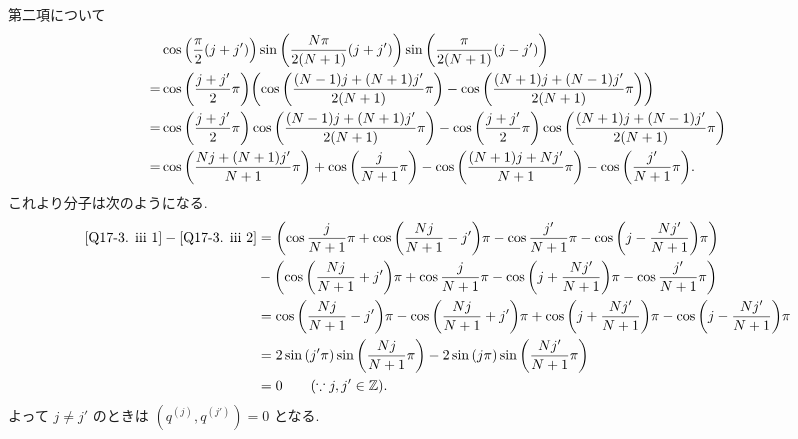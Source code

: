 \documentclass[uplatex,dvipdfmx,a4paper,11pt]{jlreq}
\newcommand{\ZZ}{\mathbb{Z}}
\theoremstyle{definition}
\begin{document}
第二項について
\begin{align}
    & \cos\qty(\frac{\pi}{2}(j + j'))\sin\qty(\frac{N\pi}{2(N+1)}(j + j'))\sin\qty(\frac{\pi}{2(N+1)}(j - j'))                                                       \\
  = & \cos\qty(\frac{j + j'}{2}\pi)\qty(\cos\qty(\frac{(N-1)j + (N+1)j'}{2(N+1)}\pi) - \cos\qty(\frac{(N+1)j + (N-1)j'}{2(N+1)}\pi))                                 \\
  = & \cos\qty(\frac{j + j'}{2}\pi)\cos\qty(\frac{(N-1)j + (N+1)j'}{2(N+1)}\pi) - \cos\qty(\frac{j + j'}{2}\pi)\cos\qty(\frac{(N+1)j + (N-1)j'}{2(N+1)}\pi)          \\
  = & \cos\qty(\frac{Nj + (N+1)j'}{N+1}\pi) + \cos\qty(\frac{j}{N+1}\pi) - \cos\qty(\frac{(N+1)j + Nj'}{N+1}\pi) - \cos\qty(\frac{j'}{N+1}\pi). \label{Q17-3. iii 2}
\end{align}
これより分子は次のようになる.
\begin{align}
  \eqref{Q17-3. iii 1} - \eqref{Q17-3. iii 2} & = \qty(\cos\frac{j}{N+1}\pi + \cos\qty(\frac{Nj}{N+1} - j')\pi - \cos\frac{j'}{N+1}\pi - \cos\qty(j - \frac{Nj'}{N+1})\pi)                  \\
                                              & - \qty(\cos\qty(\frac{Nj}{N+1} + j')\pi + \cos\frac{j}{N+1}\pi - \cos\qty(j + \frac{Nj'}{N+1})\pi - \cos\frac{j'}{N+1}\pi)                  \\
                                              & = \cos\qty(\frac{Nj}{N+1} - j')\pi - \cos\qty(\frac{Nj}{N+1} + j')\pi + \cos\qty(j + \frac{Nj'}{N+1})\pi - \cos\qty(j - \frac{Nj'}{N+1})\pi \\
                                              & = 2\sin\qty(j'\pi)\sin\qty(\frac{Nj}{N+1}\pi) - 2\sin\qty(j\pi)\sin\qty(\frac{Nj'}{N+1}\pi)                                                 \\
                                              & = 0 \qquad (\because j, j'\in\ZZ).
\end{align}
よって $j \neq j'$ のときは $(q^{(j)}, q^{(j')}) = 0$ となる.
\end{document}

